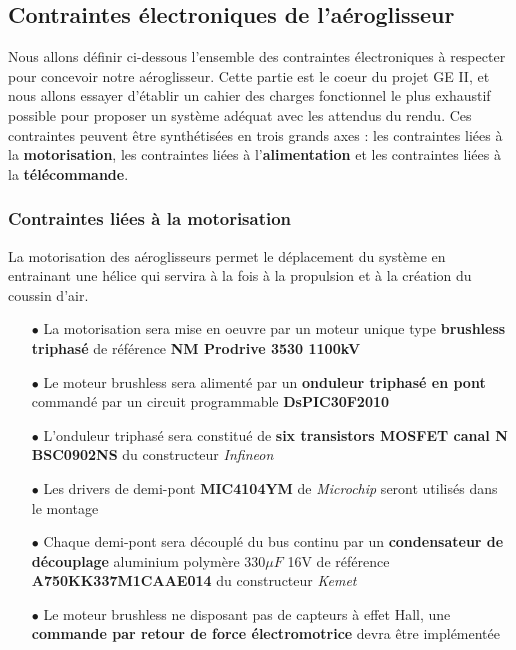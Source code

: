 \documentclass[a4paper,12pt]{report}
\begin{document}
		\vspace{-1em}
		
		\subsection{Contraintes électroniques de l'aéroglisseur}
		
		\vspace{-1em}
		
		Nous allons définir ci-dessous l'ensemble des contraintes électroniques à respecter pour concevoir notre aéroglisseur. Cette partie est le coeur du projet GE II, et nous allons essayer d'établir un cahier des charges fonctionnel le plus exhaustif possible pour proposer un système adéquat avec les attendus du rendu. Ces contraintes peuvent être synthétisées en trois grands axes : les contraintes liées à la \textbf{motorisation}, les contraintes liées à l'\textbf{alimentation} et les contraintes liées à la \textbf{télécommande}.

		\vspace{-1em}		
		
			\subsubsection{Contraintes liées à la motorisation}
			
			\vspace{-1em}
			
			La motorisation des aéroglisseurs permet le déplacement du système en entrainant une hélice qui servira à la fois à la propulsion et à la création du coussin d'air. 
			
			\begin{itemize}
				\item[$\bullet$] La motorisation sera mise en oeuvre par un moteur unique type \textbf{brushless triphasé} de référence \textbf{NM Prodrive 3530 1100kV}
				\item[$\bullet$] Le moteur brushless sera alimenté par un \textbf{onduleur triphasé en pont} commandé par un circuit programmable \textbf{DsPIC30F2010}
				\item[$\bullet$] L'onduleur triphasé sera constitué de \textbf{six transistors MOSFET canal N} \textbf{BSC0902NS} du constructeur \textit{Infineon}
				\item[$\bullet$] Les drivers de demi-pont \textbf{MIC4104YM} de \textit{Microchip} seront utilisés dans le montage
				\item[$\bullet$] Chaque demi-pont sera découplé du bus continu par un \textbf{condensateur de découplage} aluminium polymère 330$\mu F$ 16V de référence \textbf{A750KK337M1CAAE014} du constructeur \textit{Kemet}
				\item[$\bullet$] Le moteur brushless ne disposant pas de capteurs à effet Hall, une \textbf{commande par retour de force électromotrice} devra être implémentée
			\end{itemize}
			
\end{document}
